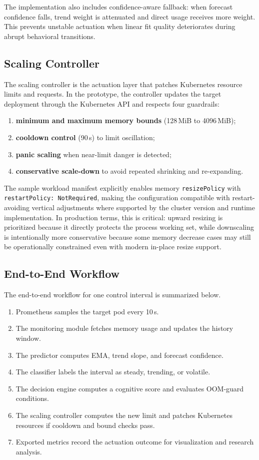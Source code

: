 \documentclass[12pt,a4paper]{article}
\newcommand{\keyword}[1]{\texttt{#1}}
\begin{document}
The implementation also includes confidence-aware fallback: when forecast confidence falls, trend weight is attenuated and direct usage receives more weight. This prevents unstable actuation when linear fit quality deteriorates during abrupt behavioral transitions.

\subsection{Scaling Controller}

The scaling controller is the actuation layer that patches Kubernetes resource limits and requests. In the prototype, the controller updates the target deployment through the Kubernetes API and respects four guardrails:
\begin{enumerate}[label=\arabic*)]
    \item \textbf{minimum and maximum memory bounds} (128\,MiB to 4096\,MiB);
    \item \textbf{cooldown control} (90\,s) to limit oscillation;
    \item \textbf{panic scaling} when near-limit danger is detected;
    \item \textbf{conservative scale-down} to avoid repeated shrinking and re-expanding.
\end{enumerate}

The sample workload manifest explicitly enables memory \keyword{resizePolicy} with \keyword{restartPolicy: NotRequired}, making the configuration compatible with restart-avoiding vertical adjustments where supported by the cluster version and runtime implementation. In production terms, this is critical: upward resizing is prioritized because it directly protects the process working set, while downscaling is intentionally more conservative because some memory decrease cases may still be operationally constrained even with modern in-place resize support.

\subsection{End-to-End Workflow}

The end-to-end workflow for one control interval is summarized below.
\begin{enumerate}[label=\arabic*)]
    \item Prometheus samples the target pod every 10\,s.
    \item The monitoring module fetches memory usage and updates the history window.
    \item The predictor computes EMA, trend slope, and forecast confidence.
    \item The classifier labels the interval as steady, trending, or volatile.
    \item The decision engine computes a cognitive score and evaluates OOM-guard conditions.
    \item The scaling controller computes the new limit and patches Kubernetes resources if cooldown and bound checks pass.
    \item Exported metrics record the actuation outcome for visualization and research analysis.
\end{enumerate}
\end{document}

